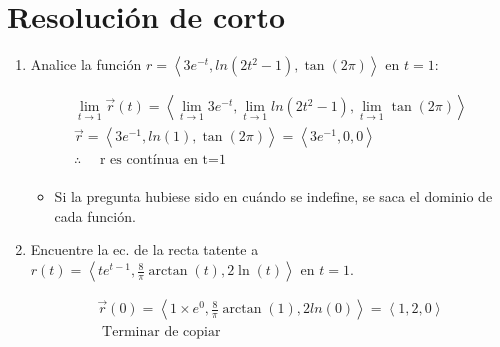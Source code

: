 



\section{Resolución de corto}
\begin{enumerate}
    \item Analice la función $r=\left\langle 3e^{-t},ln(2t^2-1),\tan(2\pi ) \right\rangle $ en $t=1$:
        \begin{center}
           \begin{align*}
               \lim_{t \to 1} \vec{r}(t) = \left\langle \lim_{t \to 1} 3e^{-t},\lim_{t \to 1} ln(2t^2-1),\lim_{t \to 1} \tan(2\pi ) \right\rangle \\ 
               \vec{r} = \left\langle 3e^{-1},ln(1),\tan(2\pi) \right\rangle  = \left\langle 3e^{-1},0,0 \right\rangle \\
               \therefore \quad \text{  r es contínua en t=1  } \\   
           \end{align*}
           \begin{itemize}[label=\#]
               \item Si la pregunta hubiese sido en cuándo se indefine, se saca el dominio de cada función.
           \end{itemize}
        \end{center}
    
    \item Encuentre la ec. de la recta tatente a $r(t)= \left\langle te^{t-1},\frac{8}{\pi } \arctan(t), 2\ln(t) \right\rangle $ en $t=1$.
        \begin{center}
           \begin{align*}
               \vec{r}(0) = \left\langle 1\times e^0,\frac{8}{\pi } \arctan(1), 2ln(0) \right\rangle = \left\langle 1,2,0 \right\rangle \\ 
            \text{  Terminar de copiar  } \\ 
           \end{align*}
        \end{center}
\end{enumerate}


